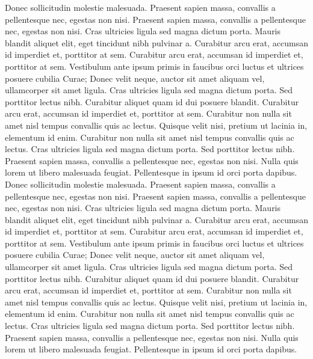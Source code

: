 \documentclass{article}
\begin{document}
Donec sollicitudin molestie malesuada. Praesent sapien massa, convallis a pellentesque nec, egestas non nisi. Praesent sapien massa, convallis a pellentesque nec, egestas non nisi. Cras ultricies ligula sed magna dictum porta. Mauris blandit aliquet elit, eget tincidunt nibh pulvinar a. Curabitur arcu erat, accumsan id imperdiet et, porttitor at sem. Curabitur arcu erat, accumsan id imperdiet et, porttitor at sem. Vestibulum ante ipsum primis in faucibus orci luctus et ultrices posuere cubilia Curae; Donec velit neque, auctor sit amet aliquam vel, ullamcorper sit amet ligula. Cras ultricies ligula sed magna dictum porta. Sed porttitor lectus nibh. Curabitur aliquet quam id dui posuere blandit. Curabitur arcu erat, accumsan id imperdiet et, porttitor at sem. Curabitur non nulla sit amet nisl tempus convallis quis ac lectus. Quisque velit nisi, pretium ut lacinia in, elementum id enim. Curabitur non nulla sit amet nisl tempus convallis quis ac lectus. Cras ultricies ligula sed magna dictum porta. Sed porttitor lectus nibh. Praesent sapien massa, convallis a pellentesque nec, egestas non nisi. Nulla quis lorem ut libero malesuada feugiat. Pellentesque in ipsum id orci porta dapibus.
Donec sollicitudin molestie malesuada. Praesent sapien massa, convallis a pellentesque nec, egestas non nisi. Praesent sapien massa, convallis a pellentesque nec, egestas non nisi. Cras ultricies ligula sed magna dictum porta. Mauris blandit aliquet elit, eget tincidunt nibh pulvinar a. Curabitur arcu erat, accumsan id imperdiet et, porttitor at sem. Curabitur arcu erat, accumsan id imperdiet et, porttitor at sem. Vestibulum ante ipsum primis in faucibus orci luctus et ultrices posuere cubilia Curae; Donec velit neque, auctor sit amet aliquam vel, ullamcorper sit amet ligula. Cras ultricies ligula sed magna dictum porta. Sed porttitor lectus nibh. Curabitur aliquet quam id dui posuere blandit. Curabitur arcu erat, accumsan id imperdiet et, porttitor at sem. Curabitur non nulla sit amet nisl tempus convallis quis ac lectus. Quisque velit nisi, pretium ut lacinia in, elementum id enim. Curabitur non nulla sit amet nisl tempus convallis quis ac lectus. Cras ultricies ligula sed magna dictum porta. Sed porttitor lectus nibh. Praesent sapien massa, convallis a pellentesque nec, egestas non nisi. Nulla quis lorem ut libero malesuada feugiat. Pellentesque in ipsum id orci porta dapibus.
\end{document}
